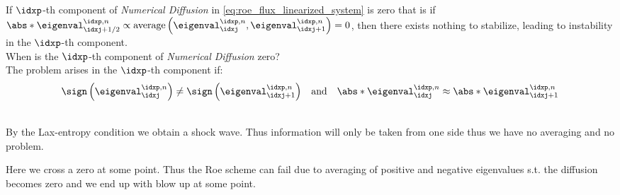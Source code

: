 \begin{sectionbox}\nospacing
    If $\idxp$-th component of \textit{Numerical Diffusion} in \cref{eq:roe_flux_linearized_system} is zero that is if $\abs*{\eigenval_{\idxj+1/2}^{\idxp,n}}\propto\text{average}\left(\eigenval_{\idxj}^{\idxp,n},\eigenval_{\idxj+1}^{\idxp,n}\right)=0$,
    then there exists nothing to stabilize, leading to instability in the $\idxp$-th component.\\
    When is the $\idxp$-th component of \textit{Numerical Diffusion} zero?\\
    The problem arises in the $\idxp$-th component if:
    \begin{align*}
      \sign\left(\eigenval_{\idxj}^{\idxp,n}\right)\neq\sign\left(\eigenval_{\idxj+1}^{\idxp,n}\right)&&\text{and}&&\abs*{\eigenval_{\idxj}^{\idxp,n}}\approx\abs*{\eigenval_{\idxj+1}^{\idxp,n}}
    \end{align*}
\end{sectionbox}
\begin{sectionbox}\nospacing \leavevmode\\
    By the Lax-entropy condition we obtain a shock wave.
    Thus information will only be taken from one side thus we have no averaging and no problem.
    \vspace{-2em}
    \begin{figure}[H]
        \centering{
            \def\svgwidth{120pt}
            \resizebox{0.6\linewidth}{!}{}
        }
    \end{figure}
\end{sectionbox}
\begin{sectionbox}\nospacing
    Here we cross a zero at some point.
    Thus the Roe scheme can fail due to averaging of positive and negative eigenvalues s.t. the diffusion becomes zero and we end up with blow up at some point.
    \vspace{-1em}
\begin{figure}[H]
    \centering{
        \def\svgwidth{120pt}
        \resizebox{0.6\linewidth}{!}{}
    }
\end{figure}
\end{sectionbox}
